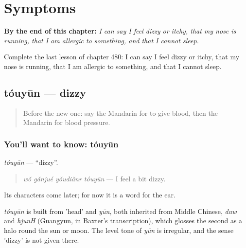 
\chapter{Symptoms}
\label{ch:zh-symptoms}

\begin{chapteropening}
\textbf{By the end of this chapter:} \emph{I can say I feel dizzy or itchy, that my nose is running, that I am allergic to something, and that I cannot sleep.}

Complete the last lesson of chapter 480: I can say I feel dizzy or itchy, that my nose is running, that I am allergic to something, and that I cannot sleep.
\end{chapteropening}

\section[tóuyūn]{tóuyūn — dizzy}

\label{lesson:ZH-C480-touyun}



\begin{quote}
Before the new one: say the Mandarin for to give blood, then the Mandarin for blood pressure.
\end{quote}

\subsection*{You'll want to know: tóuyūn}
\emph{tóuyūn} — \textquotedblleft{}dizzy\textquotedblright{}.

\begin{quote}
\emph{wǒ gǎnjué yǒudiǎnr tóuyūn} — I feel a bit dizzy.
\end{quote}

Its characters come later; for now it is a word for the ear.

\begin{cousinweb}
\emph{tóuyūn} is built from  'head' and \emph{yūn}, both inherited from Middle Chinese, \emph{duw} and \emph{hjunH} (Guangyun, in Baxter's transcription), which glosses the second as a halo round the sun or moon. The level tone of \emph{yūn} is irregular, and the sense 'dizzy' is not given there.
\end{cousinweb}

